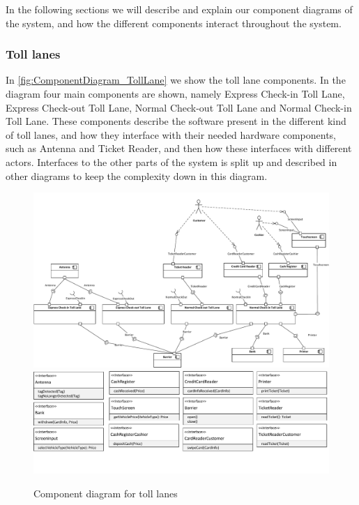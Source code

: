 
In the following sections we will describe and explain our component diagrams of the system, and how the different components interact throughout the system.
\subsubsection*{Toll lanes}
In \autoref{fig:ComponentDiagram_TollLane} we show the toll lane components. In the diagram four main components are shown, namely Express Check-in Toll Lane, Express Check-out Toll Lane, Normal Check-out Toll Lane and Normal Check-in Toll Lane. These components describe the software present in the different kind of toll lanes, and how they interface with their needed hardware components, such as Antenna and Ticket Reader, and then how these interfaces with different actors. Interfaces to the other parts of the system is split up and described in other diagrams to keep the complexity down in this diagram.
\begin{figure}[H]
\centering
\includegraphics[width=1\textwidth]{img/component_diagrams/ComponentDiagram_TollLane_components}
\includegraphics[width=1\textwidth]{img/component_diagrams/ComponentDiagram_TollLane_interfaces}
\caption{Component diagram for toll lanes}
\label{fig:ComponentDiagram_TollLane}
\end{figure}

